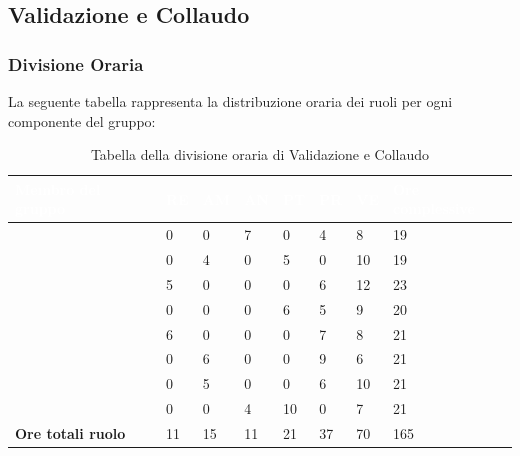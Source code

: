 \subsection{Validazione e Collaudo}

\subsubsection{Divisione Oraria}
La seguente tabella rappresenta la distribuzione oraria dei ruoli per ogni componente del gruppo:
{
\renewcommand{\arraystretch}{2}
\begin{longtable}[h!] { C{4cm} C{1cm} C{1cm} C{1cm} C{1cm} C{1cm} C{1cm} C{3cm}}
\caption{Tabella della divisione oraria di Validazione e Collaudo}\\

\textcolor{white}{\textbf{Membro del gruppo}} & 
\textcolor{white}{\textbf{RE}} & 
\textcolor{white}{\textbf{AM}} & 
\textcolor{white}{\textbf{AN}} & 
\textcolor{white}{\textbf{PT}} & 
\textcolor{white}{\textbf{PR}} &
\textcolor{white}{\textbf{VE}} &
\textcolor{white}{\textbf{Ore complessive}}\\	
\endhead
        
\MC{}                     &  0 &  0 &  7 &  0 &  4 &  8 &  19 \\
\LD{}                     &  0 &  4 &  0 &  5 &  0 & 10 &  19 \\
\CE{}                     &  5 &  0 &  0 &  0 &  6 & 12 &  23 \\ 
\SE{}                     &  0 &  0 &  0 &  6 &  5 &  9 &  20 \\
\PF{}                     &  6 &  0 &  0 &  0 &  7 &  8 &  21 \\
\DF{}                     &  0 &  6 &  0 &  0 &  9 &  6 &  21 \\
\BR{}                     &  0 &  5 &  0 &  0 &  6 & 10 &  21 \\
\AT{}                     &  0 &  0 &  4 & 10 &  0 &  7 &  21 \\
\textbf{Ore totali ruolo} & 11 & 15 & 11 & 21 & 37 & 70 & 165 \\
		
\end{longtable}
}


